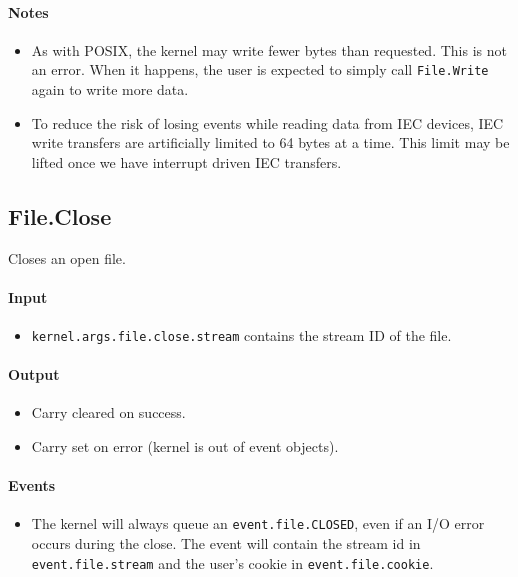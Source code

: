 \paragraph{Notes}

\begin{itemize}
\item As with POSIX, the kernel may write fewer bytes than requested.  This is not an error.  When it happens, the user is expected to simply call \verb+File.Write+ again to write more data.

\item To reduce the risk of losing events while reading data from IEC devices, IEC write transfers are artificially limited to 64 bytes at a time.  This limit may be lifted once we have interrupt driven IEC transfers.
\end{itemize}

\subsection*{File.Close}
Closes an open file.

\paragraph{Input}

\begin{itemize}
\item \verb+kernel.args.file.close.stream+ contains the stream ID of the file.
\end{itemize}

\paragraph{Output}

\begin{itemize}
\item Carry cleared on success.
\item Carry set on error (kernel is out of event objects).
\end{itemize}

\paragraph{Events}

\begin{itemize}
\item The kernel will always queue an \verb+event.file.CLOSED+, even if an I/O error occurs during the close.  The event will contain the stream id in \verb+event.file.stream+ and the user's cookie in \verb+event.file.cookie+.
\end{itemize}

